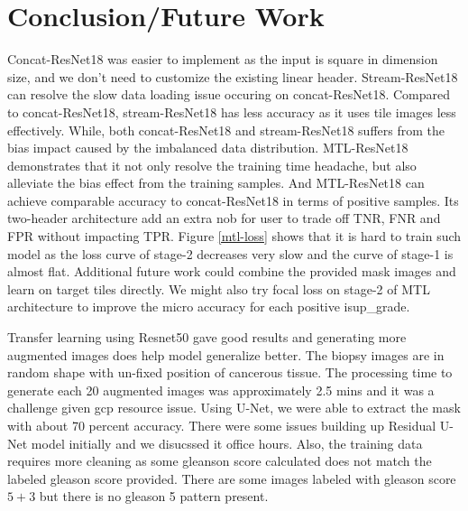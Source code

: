 \documentclass[10pt,twocolumn,letterpaper]{article}
\begin{document}
\section{Conclusion/Future Work}
Concat-ResNet18 was easier to implement as the input is square in dimension size, and we don't need to customize the existing linear header. Stream-ResNet18 can resolve the slow data loading issue occuring on concat-ResNet18. Compared to concat-ResNet18, stream-ResNet18 has less accuracy as it uses tile images less effectively. While, both concat-ResNet18 and stream-ResNet18 suffers from the bias impact caused by the imbalanced data distribution. MTL-ResNet18 demonstrates that it not only resolve the training time headache, but also alleviate the bias effect from the training samples. And MTL-ResNet18 can achieve comparable accuracy to concat-ResNet18 in terms of positive samples. Its two-header architecture add an extra nob for user to trade off TNR, FNR and FPR without impacting TPR. Figure \ref{mtl-loss} shows that it is hard to train such model as the loss curve of stage-2 decreases very slow and the curve of stage-1 is almost flat. 
Additional future work could combine the provided mask images and learn on target tiles directly. We might also try focal loss on stage-2 of MTL architecture to improve the micro accuracy for each positive isup\_grade. 


Transfer learning using Resnet50 gave good results and generating more augmented images does help model generalize better. The biopsy images are in random shape with un-fixed position of cancerous tissue. The processing time to generate each 20 augmented images was approximately 2.5 mins and it was a challenge given gcp resource issue. Using U-Net, we were able to extract the mask with about 70 percent accuracy. There were some issues building up Residual U-Net model initially and we disucssed it office hours. Also, the training data requires  more cleaning as some gleanson score calculated does not match the labeled gleason score provided. There are some images labeled with gleason score   $5+3$ but there is no gleason 5 pattern present. 

\end{document}
